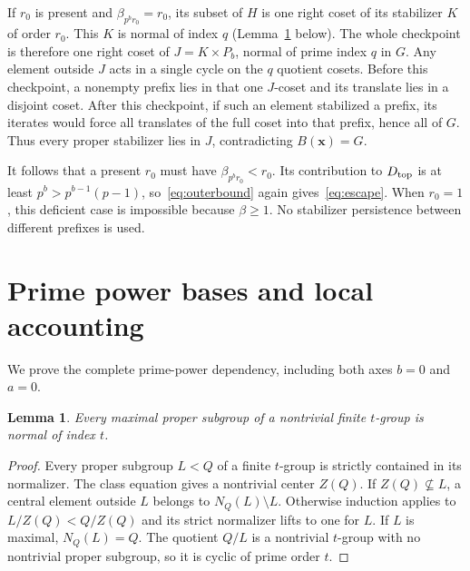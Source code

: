 \documentclass[11pt,letterpaper]{article}
\newtheorem{lemma}[theorem]{Lemma}
\theoremstyle{definition}\newtheorem{definition}{Definition}
\begin{document}
If $r_0$ is present and $\beta_{p^br_0}=r_0$, its subset of $H$ is one right coset of its stabilizer $K$ of order $r_0$. This $K$ is normal of index $q$ (Lemma~\ref{lem:normal} below). The whole checkpoint is therefore one right coset of $J=K\times P_b$, normal of prime index $q$ in $G$. Any element outside $J$ acts in a single cycle on the $q$ quotient cosets. Before this checkpoint, a nonempty prefix lies in that one $J$-coset and its translate lies in a disjoint coset. After this checkpoint, if such an element stabilized a prefix, its iterates would force all translates of the full coset into that prefix, hence all of $G$. Thus every proper stabilizer lies in $J$, contradicting $B(\mathbf{x})=G$.

It follows that a present $r_0$ must have $\beta_{p^br_0}<r_0$. Its contribution to $D_{\rm top}$ is at least $p^b>p^{b-1}(p-1)$, so~\eqref{eq:outerbound} again gives~\eqref{eq:escape}. When $r_0=1$, this deficient case is impossible because $\beta\ge1$. No stabilizer persistence between different prefixes is used.

\section{Prime power bases and local accounting}\label{sec:bases}
We prove the complete prime-power dependency, including both axes $b=0$ and $a=0$.

\begin{lemma}\label{lem:normal}
Every maximal proper subgroup of a nontrivial finite $t$-group is normal of index $t$.
\end{lemma}
\begin{proof}
Every proper subgroup $L<Q$ of a finite $t$-group is strictly contained in its normalizer. The class equation gives a nontrivial center $Z(Q)$. If $Z(Q)\not\subseteq L$, a central element outside $L$ belongs to $N_Q(L)\setminus L$. Otherwise induction applies to $L/Z(Q)<Q/Z(Q)$ and its strict normalizer lifts to one for $L$. If $L$ is maximal, $N_Q(L)=Q$. The quotient $Q/L$ is a nontrivial $t$-group with no nontrivial proper subgroup, so it is cyclic of prime order $t$.
\end{proof}
\end{document}
